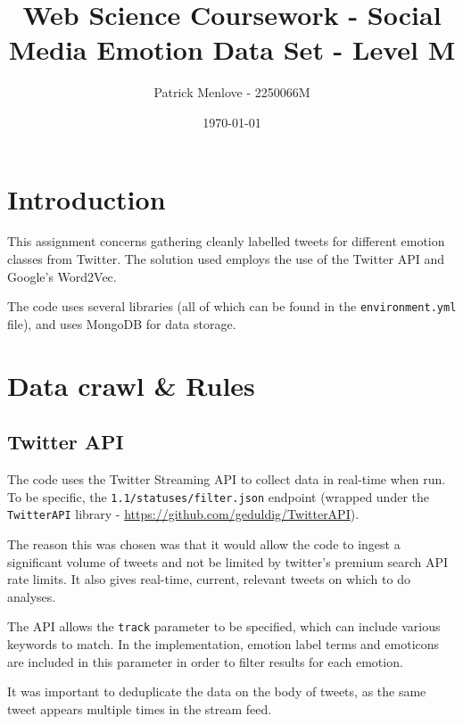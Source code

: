 \documentclass{mproj}
\begin{document}
\title{Web Science Coursework - Social Media Emotion Data Set - Level M}
\author{Patrick Menlove - 2250066M}
\date{\today}
\maketitle

\newpage

\section{Introduction}

This assignment concerns gathering cleanly labelled tweets for different emotion classes from Twitter. The solution used employs the use of the Twitter API and Google's Word2Vec.

The code uses several libraries (all of which can be found in the \lstinline{environment.yml} file), and uses MongoDB for data storage.

\section{Data crawl \& Rules}
\subsection{Twitter API}

The code uses the Twitter Streaming API to collect data in real-time when run. To be specific, the \lstinline!1.1/statuses/filter.json! endpoint (wrapped under the \lstinline{TwitterAPI} library - \url{https://github.com/geduldig/TwitterAPI}).

The reason this was chosen was that it would allow the code to ingest a significant volume of tweets and not be limited by twitter's premium search API rate limits. It also gives real-time, current, relevant tweets on which to do analyses.

The API allows the \lstinline{track} parameter to be specified, which can include various keywords to match. In the implementation, emotion label terms and emoticons are included in this parameter in order to filter results for each emotion.

It was important to deduplicate the data on the body of tweets, as the same tweet appears multiple times in the stream feed.
\end{document}
